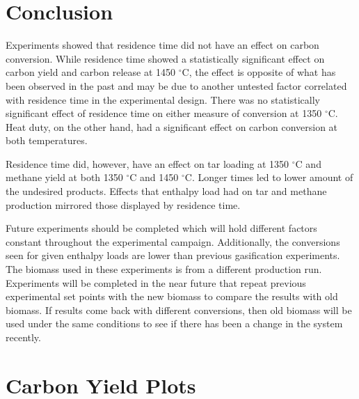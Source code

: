 \documentclass[11pt,twocolumn]{article}
\begin{document}
\balance
\section*{Conclusion}

Experiments showed that residence time did not have an effect on carbon conversion.  While residence time showed a statistically significant effect on carbon yield and carbon release at 1450 $^\circ$C, the effect is opposite of what has been observed in the past and may be due to another untested factor correlated with residence time in the experimental design.  There was no statistically significant effect of residence time on either measure of conversion at 1350 $^\circ$C.  Heat duty, on the other hand, had a significant effect on carbon conversion at both temperatures.

Residence time did, however, have an effect on tar loading at 1350 $^\circ$C and methane yield at both 1350 $^\circ$C and 1450 $^\circ$C.  Longer times led to lower amount of the undesired products.  Effects that enthalpy load had on tar and methane production mirrored those displayed by residence time.

Future experiments should be completed which will hold different factors constant throughout the experimental campaign.  Additionally, the conversions seen for given enthalpy loads are lower than previous gasification experiments.  The biomass used in these experiments is from a different production run.  Experiments will be completed in the near future that repeat previous experimental set points with the new biomass to compare the results with old biomass.  If results come back with different conversions, then old biomass will be used under the same conditions to see if there has been a change in the system recently.

\onecolumn
\newpage
\appendix


\section{Carbon Yield Plots}
\label{app_plots_cyield}
\end{document}
